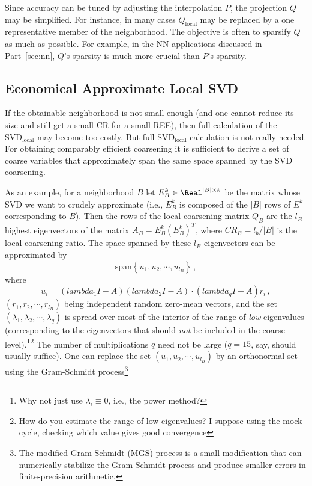 \documentclass{article} %
\begin{document}
Since accuracy can be tuned by adjusting the interpolation $P$, the projection $Q$ may be simplified. For instance, in many cases $Q_{\text{local}}$ may be replaced by a one representative member of the neighborhood. The objective is often to sparsify $Q$ as much as possible. For example, in the NN applications discussed in Part~\ref{sec:nn}, $Q$'s sparsity is much more crucial than $P$'s sparsity.

\subsection{Economical Approximate Local SVD}
\label{sec:econonmical_svd}
If the obtainable neighborhood is not small enough (and one cannot reduce its size and still get a small CR for a small REE), then full calculation of the $\text{SVD}_{\text{local}}$ may become too costly. But full $\text{SVD}_{\text{local}}$ calculation is not really needed. For obtaining comparably efficient coarsening it is sufficient to derive a set of coarse variables that approximately span the same space spanned by the SVD coarsening.

As an example, for a neighborhood $B$ let $E^k_B \in \Real^{|B| \times k}$ be the matrix whose SVD we want to crudely approximate (i.e., $E^k_B$ is composed of the $|B|$ rows of $E^k$ corresponding to $B$). Then the rows of the local coarsening matrix $Q_B$ are the $l_B$ highest eigenvectors of the matrix $A_B = E^k_B (E^k_B)^T$, where $CR_B = l_b/|B|$ is the local coarsening ratio. The space spanned by these $l_B$ eigenvectors can be approximated by
$$ \text{span}\left\{u_1, u_2, \cdots, u_{l_B} \right\}\,,$$
where
\begin{equation}
    u_i = \left(lambda_1 I - A\right) \left(lambda_2 I - A\right) \cdot \left(lambda_q I - A\right) r_i\,,
    \label{ui}
\end{equation}
$(r_1, r_2, \cdots, r_{l_B})$ being independent random zero-mean vectors, and the set $(\lambda_1, \lambda_2, \cdots, \lambda_q)$ is spread over most of the interior of the range of {\it low} eigenvalues (corresponding to the eigenvectors that should {\it not} be included in the coarse level).\footnote{Why not just use $\lambda_i \equiv 0$, i.e., the power method?}\footnote{How do you estimate the range of low eigenvalues? I suppose using the mock cycle, checking which value gives good convergence} The number of multiplications $q$ need not be large ($q = 15$, say, should usually suffice). One can replace the set $(u_1, u_2, \cdots, u_{l_B})$ by an orthonormal set using the Gram-Schmidt process\footnote{The modified Gram-Schmidt (MGS) process is a small modification that can numerically stabilize the Gram-Schmidt process and produce smaller errors in finite-precision arithmetic.}
\end{document}

